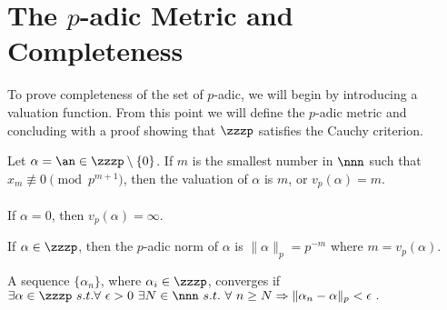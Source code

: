 \section{The $p$-adic Metric and Completeness}
  To prove completeness of the set of $p$-adic, we will begin
  by introducing a valuation function. From this point we will
  define the $p$-adic metric and concluding with a proof showing
  that $\zzzp$ satisfies the Cauchy criterion.

\label{pval}
\begin{definition}
  Let $\alpha=\an\in\zzzp\setminus\{0\}$. If $m$ is the smallest
  number in $\nnn$ such that $x_m \not\equiv 0 \pmod p^{m+1}$,
  then the valuation of $\alpha$ is $m$, or $v_p(\alpha)=m$. \\ \\
  
  If $\alpha=0$, then $v_p(\alpha)=\infty$.
\end{definition}

\label{pnorm}
\begin{definition}
  If $\alpha \in \zzzp$, then the $p$-adic norm of $\alpha$ is
  $\lVert \alpha \rVert_p = p^{-m}$ where $m = v_p(\alpha)$. 
\end{definition}

%
% 

\begin{definition} \label{def:cauchy}
  A sequence $\{\alpha_n\}$, where $\alpha_i\in\zzzp$, converges
  if \ $\exists\alpha\in\zzzp \ s.t. \\ \forall \ \epsilon>0 \ 
  \exists N \in\nnn \ s.t. \ \forall \ n \geq N \Rightarrow \lVert\alpha_n-\alpha\rVert_p<\epsilon \ .$
\end{definition}
